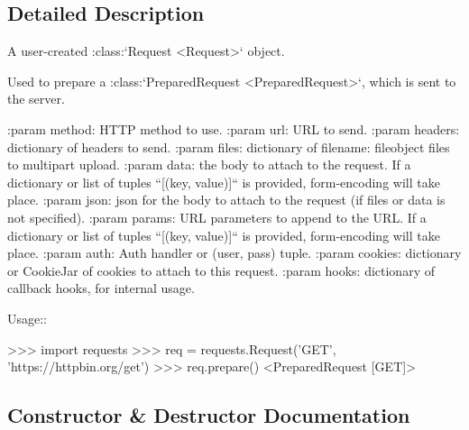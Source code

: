 \subsection{Detailed Description}
\begin{DoxyVerb}A user-created :class:`Request <Request>` object.

Used to prepare a :class:`PreparedRequest <PreparedRequest>`, which is sent to the server.

:param method: HTTP method to use.
:param url: URL to send.
:param headers: dictionary of headers to send.
:param files: dictionary of {filename: fileobject} files to multipart upload.
:param data: the body to attach to the request. If a dictionary or
    list of tuples ``[(key, value)]`` is provided, form-encoding will
    take place.
:param json: json for the body to attach to the request (if files or data is not specified).
:param params: URL parameters to append to the URL. If a dictionary or
    list of tuples ``[(key, value)]`` is provided, form-encoding will
    take place.
:param auth: Auth handler or (user, pass) tuple.
:param cookies: dictionary or CookieJar of cookies to attach to this request.
:param hooks: dictionary of callback hooks, for internal usage.

Usage::

  >>> import requests
  >>> req = requests.Request('GET', 'https://httpbin.org/get')
  >>> req.prepare()
  <PreparedRequest [GET]>
\end{DoxyVerb}
 

\subsection{Constructor \& Destructor Documentation}
\mbox{\label{classpip_1_1__vendor_1_1requests_1_1models_1_1Request_a08cc53ad5e35305ac699e7457473d756}} 
